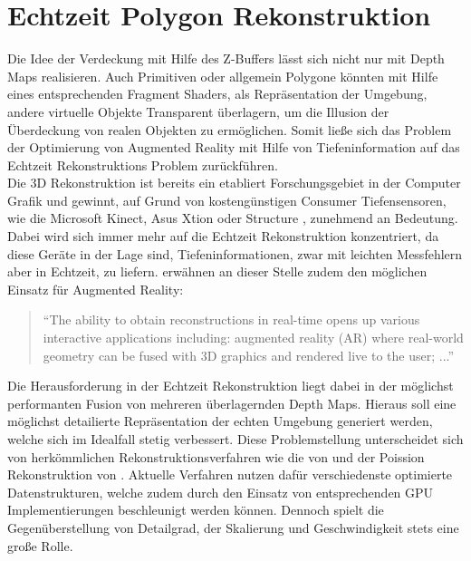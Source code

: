 \section{Echtzeit Polygon Rekonstruktion}

Die Idee der Verdeckung mit Hilfe des Z-Buffers lässt sich nicht nur mit Depth Maps realisieren. Auch Primitiven oder allgemein Polygone könnten mit Hilfe eines entsprechenden Fragment Shaders, als Repräsentation der Umgebung, andere virtuelle Objekte Transparent überlagern, um die Illusion der Überdeckung von realen Objekten zu ermöglichen. Somit ließe sich das Problem der Optimierung von Augmented Reality mit Hilfe von Tiefeninformation auf das Echtzeit Rekonstruktions Problem zurückführen. \\

Die 3D Rekonstruktion ist bereits ein etabliert Forschungsgebiet in der Computer Grafik und gewinnt, auf Grund von kostengünstigen Consumer Tiefensensoren, wie die Microsoft Kinect, Asus Xtion oder Structure \citep{Struc48:online}, zunehmend an Bedeutung. Dabei wird sich immer mehr auf die Echtzeit Rekonstruktion konzentriert, da diese Geräte in der Lage sind, Tiefeninformationen, zwar mit leichten Messfehlern aber in Echtzeit, zu liefern. \citet{niessner2013real} erwähnen an dieser Stelle zudem den möglichen Einsatz für Augmented Reality:

\begin{quote}
\enquote{The ability to obtain reconstructions
in real-time opens up various interactive applications including:
augmented reality (AR) where real-world geometry can be fused
with 3D graphics and rendered live to the user; ...} \citep{niessner2013real}
\end{quote}

Die Herausforderung in der Echtzeit Rekonstruktion liegt dabei in der möglichst performanten Fusion von mehreren überlagernden Depth Maps. Hieraus soll eine möglichst detailierte Repräsentation der echten Umgebung generiert werden, welche sich im Idealfall stetig verbessert. Diese Problemstellung unterscheidet sich von herkömmlichen Rekonstruktionsverfahren wie die von \citet{hoppe1992surface} und der Poission Rekonstruktion von \citet{kazhdan2006poisson}. Aktuelle Verfahren nutzen dafür verschiedenste optimierte Datenstrukturen, welche zudem durch den Einsatz von entsprechenden GPU Implementierungen beschleunigt werden können. Dennoch spielt die Gegenüberstellung von Detailgrad, der Skalierung und Geschwindigkeit stets eine große Rolle. \citet{niessner2013real} \\

